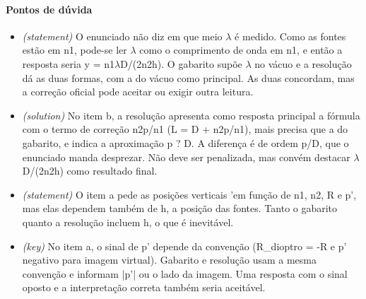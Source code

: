 \documentclass{article}%
\begin{document}
\paragraph{Pontos de dúvida}%
\begin{itemize}%
\item%
\textit{(statement)} O enunciado não diz em que meio $\lambda$ é medido. Como as fontes estão em n1, pode{-}se ler $\lambda$ como o comprimento de onda em n1, e então a resposta seria y = n1$\lambda$D/(2n2h). O gabarito supõe $\lambda$ no vácuo e a resolução dá as duas formas, com a do vácuo como principal. As duas concordam, mas a correção oficial pode aceitar ou exigir outra leitura.%
\item%
\textit{(solution)} No item b, a resolução apresenta como resposta principal a fórmula com o termo de correção n2p/n1 (L = D + n2p/n1), mais precisa que a do gabarito, e indica a aproximação p ? D. A diferença é de ordem p/D, que o enunciado manda desprezar. Não deve ser penalizada, mas convém destacar $\lambda$D/(2n2h) como resultado final.%
\item%
\textit{(statement)} O item a pede as posições verticais 'em função de n1, n2, R e p', mas elas dependem também de h, a posição das fontes. Tanto o gabarito quanto a resolução incluem h, o que é inevitável.%
\item%
\textit{(key)} No item a, o sinal de p' depende da convenção (R\_dioptro = -R e p' negativo para imagem virtual). Gabarito e resolução usam a mesma convenção e informam |p'| ou o lado da imagem. Uma resposta com o sinal oposto e a interpretação correta também seria aceitável.%
\end{itemize}%
\end{document}
